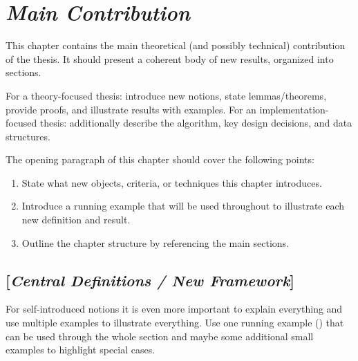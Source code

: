 \chapter{\textit{Main Contribution}}
\label{ch:mainmatter}

This chapter contains the main theoretical (and possibly technical) contribution of the thesis.
It should present a coherent body of new results, organized into sections.

For a theory-focused thesis: introduce new notions, state lemmas/theorems,
provide proofs, and illustrate results with examples.
For an implementation-focused thesis: additionally describe the algorithm,
key design decisions, and data structures.

The opening paragraph of this chapter should cover the following points:
\begin{enumerate}
    \item State what new objects, criteria, or techniques this chapter introduces.
    \item Introduce a running example that will be used throughout to illustrate
          each new definition and result.
    \item Outline the chapter structure by referencing the main sections.
\end{enumerate}

\section{[\textit{Central Definitions / New Framework}]}\label{sec:main-definitions}


For self-introduced notions it is even more important to explain everything
and use multiple examples to illustrate everything.
Use one running example () that can be used through the whole section 
and maybe some additional small examples to highlight special cases.

